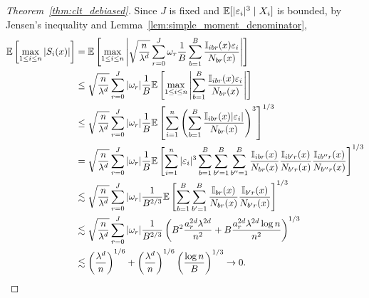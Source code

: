 \begin{proof}[Theorem~\ref{thm:clt_debiased}]
  Since $J$ is fixed and
  $\mathbb{E}[|\varepsilon_i|^3 \mid X_i]$ is bounded,
  by Jensen's inequality and
  Lemma~\ref{lem:simple_moment_denominator},
  \begin{align*}
    \mathbb{E}\left[\max_{1 \leq i \leq n} |S_i(x)| \right]
    &=
    \mathbb{E}\left[\max_{1 \leq i \leq n}
      \left|
      \sqrt{\frac{n}{\lambda^d}}
      \sum_{r=0}^{J}
      \omega_r
      \frac{1}{B} \sum_{b=1}^B
      \frac{\mathbb{I}_{i b r}(x) \varepsilon_i} {N_{b r}(x)}
      \right|
    \right] \\
    &\leq
    \sqrt{\frac{n}{\lambda^d}}
    \sum_{r=0}^{J}
    |\omega_r|
    \frac{1}{B}
    \mathbb{E}\left[\max_{1 \leq i \leq n}
      \left|
      \sum_{b=1}^B
      \frac{\mathbb{I}_{i b r}(x) \varepsilon_i} {N_{b r}(x)}
      \right|
    \right] \\
    &\leq
    \sqrt{\frac{n}{\lambda^d}}
    \sum_{r=0}^{J}
    |\omega_r|
    \frac{1}{B}
    \mathbb{E}\left[
      \sum_{i=1}^{n}
      \left(
        \sum_{b=1}^B
        \frac{\mathbb{I}_{i b r}(x) |\varepsilon_i|} {N_{b r}(x)}
      \right)^3
    \right]^{1/3} \\
    &=
    \sqrt{\frac{n}{\lambda^d}}
    \sum_{r=0}^{J}
    |\omega_r|
    \frac{1}{B}
    \mathbb{E}\left[
      \sum_{i=1}^{n}
      |\varepsilon_i|^3
      \sum_{b=1}^B
      \sum_{b'=1}^B
      \sum_{b''=1}^B
      \frac{\mathbb{I}_{i b r}(x) } {N_{b r}(x)}
      \frac{\mathbb{I}_{i b' r}(x) } {N_{b' r}(x)}
      \frac{\mathbb{I}_{i b'' r}(x) } {N_{b'' r}(x)}
    \right]^{1/3} \\
    &\lesssim
    \sqrt{\frac{n}{\lambda^d}}
    \sum_{r=0}^{J}
    |\omega_r|
    \frac{1}{B^{2/3}}
    \mathbb{E}\left[
      \sum_{b=1}^B
      \sum_{b'=1}^B
      \frac{\mathbb{I}_{b r}(x)} {N_{b r}(x)}
      \frac{\mathbb{I}_{b' r}(x)} {N_{b' r}(x)}
    \right]^{1/3} \\
    &\lesssim
    \sqrt{\frac{n}{\lambda^d}}
    \sum_{r=0}^{J}
    |\omega_r|
    \frac{1}{B^{2/3}}
    \left(
      B^2 \frac{a_r^{2d} \lambda^{2d}}{n^2}
      + B \frac{a_r^{2d} \lambda^{2d} \log n}{n^2}
    \right)^{1/3} \\
    &\lesssim
    \left( \frac{\lambda^d}{n} \right)^{1/6}
    + \left( \frac{\lambda^d}{n} \right)^{1/6}
    \left( \frac{\log n}{B} \right)^{1/3}
    \to 0.
  \end{align*}


\end{proof}
